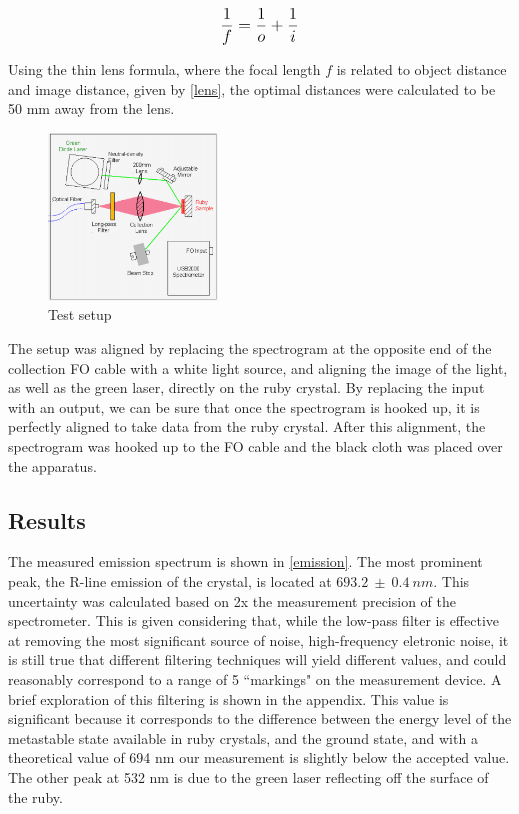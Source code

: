 \documentclass[aps,prl,reprint]{revtex4-2}
\begin{document}
\begin{equation}
	\mathlarger{\frac{1}{f} = \frac{1}{o} + \frac{1}{i}}
	\label{lens}
\end{equation}

Using the thin lens formula, where the focal length $f$ is related to object distance 
and image distance, given by \ref{lens}, the optimal distances were 
calculated to be 50 mm away from the lens.\\

\begin{figure}[h]
	\includegraphics[width=0.4\textwidth]{../Images/l3_C.png}
	\caption{\label{C} Test setup}
\end{figure}

The setup was aligned by replacing the spectrogram at the opposite end
of the collection FO cable with a white light source, and aligning the image of the
light, as well as the green laser, directly on the ruby crystal. By replacing the 
input with an output, we can be sure that once the spectrogram is hooked up, it is
perfectly aligned to take data from the ruby crystal. After this alignment,
the spectrogram was hooked up to the FO cable and the black cloth was placed over
the apparatus. 

\subsection{Results}

The measured emission spectrum is shown in \ref{emission}. The most prominent peak,
the R-line emission of the crystal, is located at $693.2\ \pm\ 0.4\ nm$. This 
uncertainty was calculated based on 2x the measurement precision of the spectrometer.
This is given considering that, while the low-pass filter is effective at removing the 
most significant source of noise, high-frequency eletronic noise, it is still true
that different filtering techniques will yield different values, and could reasonably
correspond to a range of 5 ``markings" on the measurement device.
A brief exploration of this filtering is shown in the appendix.
This value is significant because it corresponds to the difference between the energy
level of the metastable state available in ruby crystals, and the ground state, and
with a theoretical value of 694 nm our measurement is slightly below the accepted
value. The other peak at 532 nm is due to the green laser reflecting off the surface
of the ruby.
\end{document}
